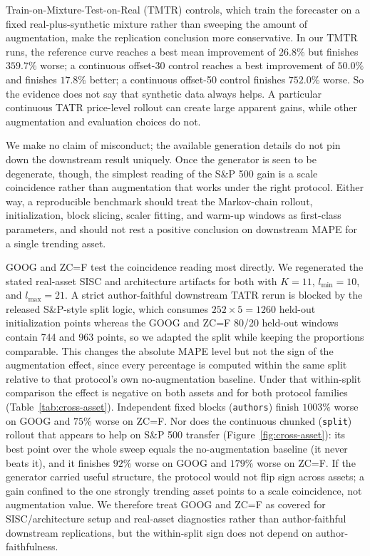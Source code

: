 \documentclass{article}
\begin{document}
Train-on-Mixture-Test-on-Real (TMTR) controls, which train the forecaster on a fixed real-plus-synthetic mixture rather than sweeping the amount of augmentation, make the replication conclusion more conservative. In our TMTR runs, the reference curve reaches a best mean improvement of $26.8\%$ but finishes $359.7\%$ worse; a continuous offset-30 control reaches a best improvement of $50.0\%$ and finishes $17.8\%$ better; a continuous offset-50 control finishes $752.0\%$ worse. So the evidence does not say that synthetic data always helps. A particular continuous TATR price-level rollout can create large apparent gains, while other augmentation and evaluation choices do not.

We make no claim of misconduct; the available generation details do not pin down the downstream result uniquely. Once the generator is seen to be degenerate, though, the simplest reading of the S\&P 500 gain is a scale coincidence rather than augmentation that works under the right protocol. Either way, a reproducible benchmark should treat the Markov-chain rollout, initialization, block slicing, scaler fitting, and warm-up windows as first-class parameters, and should not rest a positive conclusion on downstream MAPE for a single trending asset.

GOOG and ZC=F test the coincidence reading most directly. We regenerated the stated real-asset SISC and architecture artifacts for both with $K=11$, $l_{\min}=10$, and $l_{\max}=21$. A strict author-faithful downstream TATR rerun is blocked by the released S\&P-style split logic, which consumes $252\times5=1260$ held-out initialization points whereas the GOOG and ZC=F 80/20 held-out windows contain 744 and 963 points, so we adapted the split while keeping the proportions comparable. This changes the absolute MAPE level but not the sign of the augmentation effect, since every percentage is computed within the same split relative to that protocol's own no-augmentation baseline. Under that within-split comparison the effect is negative on both assets and for both protocol families (Table~\ref{tab:cross-asset}). Independent fixed blocks (\texttt{authors}) finish $1003\%$ worse on GOOG and $75\%$ worse on ZC=F. Nor does the continuous chunked (\texttt{split}) rollout that appears to help on S\&P 500 transfer (Figure~\ref{fig:cross-asset}): its best point over the whole sweep equals the no-augmentation baseline (it never beats it), and it finishes $92\%$ worse on GOOG and $179\%$ worse on ZC=F. If the generator carried useful structure, the protocol would not flip sign across assets; a gain confined to the one strongly trending asset points to a scale coincidence, not augmentation value. We therefore treat GOOG and ZC=F as covered for SISC/architecture setup and real-asset diagnostics rather than author-faithful downstream replications, but the within-split sign does not depend on author-faithfulness.
\end{document}
